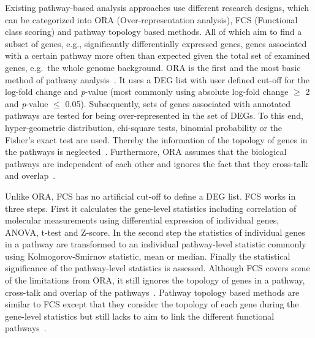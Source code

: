 \documentclass[10pt,a4paper,twocolumn]{article}
\begin{document}
	
	Existing pathway-based analysis approaches use different research
	designs, which can be categorized into ORA (Over-representation
	analysis), FCS (Functional class scoring) and pathway topology based
	methods. All of which aim to find a subset of genes, e.g.,
	significantly differentially expressed genes, genes associated with a
	certain pathway more often than expected given the total set of
	examined genes, e.g.~the whole genome background. ORA is
	the first and the most basic method of pathway analysis~\cite{Campos}. It uses a
	DEG list with user defined cut-off for the log-fold change and
	\textit{p}-value (most commonly using absolute log-fold change $\geq$
	2 and \textit{p}-value $\leq$ 0.05). Subsequently, sets of genes
	associated with annotated pathways are tested for being
	over-represented in the set of DEGs. To this end, hyper-geometric
	distribution, chi-square tests, binomial probability or the Fisher’s
	exact test are used. Thereby the information of the topology of genes
	in the pathways is neglected~\cite{Bayer}. Furthermore, ORA assumes
	that the biological pathways are independent of each other and ignores
	the fact that they cross-talk and overlap~\cite{Khatri2012,Campos}.
	
	Unlike ORA, FCS has no artificial cut-off to define a DEG list. FCS works in
	three steps. First it calculates the gene-level statistics including
	correlation of molecular measurements using differential expression of
	individual genes, ANOVA, t-test and Z-score. In the second step the
	statistics of individual genes in a pathway are transformed to an
	individual pathway-level statistic commonly using Kolmogorov-Smirnov
	statistic, mean or median. Finally the statistical significance of the
	pathway-level statistics is assessed. Although FCS covers some of the
	limitations from ORA, it still ignores the topology of genes in a pathway,
	cross-talk and overlap of the pathways~\cite{Khatri2012,Campos}. Pathway
	topology based methods are similar to FCS except that they consider the
	topology of each gene during the gene-level statistics but still lacks to aim
	to link the different functional pathways~\cite{Khatri2012}.
	
\end{document}
